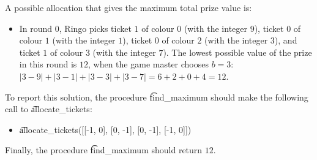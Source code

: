 A possible allocation that gives the maximum total prize value is:
\begin{itemize}
\item In round $0$, Ringo picks ticket $1$ of colour $0$ (with the integer $9$), ticket $0$ of colour $1$ (with the integer $1$), ticket $0$ of colour $2$ (with the integer $3$), and ticket $1$ of colour $3$ (with the integer $7$). The lowest possible value of the prize in this round is $12$, when the game master chooses $b = 3$: $|3 - 9| + |3 - 1| + |3 - 3| + |3 - 7| = 6 + 2 + 0 + 4 = 12$.
\end{itemize}

To report this solution, the procedure \t{find\_maximum} should make the following call to \t{allocate\_tickets}:
\begin{itemize}
\item \t{allocate\_tickets([[-1, 0], [0, -1], [0, -1], [-1, 0]])}
\end{itemize}

Finally, the procedure \t{find\_maximum} should return $12$.